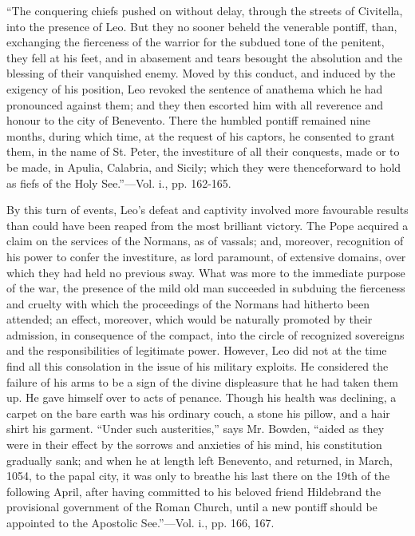 ``The
conquering chiefs pushed on without delay, through the streets of
Civitella, into the presence of Leo. But they no sooner beheld the
venerable pontiff, than, exchanging the fierceness of the warrior for
the subdued tone of the penitent, they fell at his feet, and in
abasement and tears besought the absolution and the blessing of their
vanquished enemy. Moved by this conduct, and induced by the exigency
of his position, Leo revoked the sentence of anathema which he had
pronounced against them; and they then escorted him with all reverence
and honour to the city of Benevento. There the humbled pontiff
remained nine months, during which time, at the request of his
captors, he consented to grant them, in the name of St. Peter, the
investiture of all their conquests, made or to be made, in Apulia,
Calabria, and Sicily; which they were thenceforward to hold as fiefs
of the Holy See.''—Vol. i., pp. 162-165.

By this turn of events, Leo's defeat and
captivity involved more favourable results than could have been reaped
from the most brilliant victory. The Pope acquired a claim on the
services of the Normans, as of vassals; and, moreover, recognition of
his power to confer the investiture, as lord paramount, of extensive
domains, over which they had held no previous sway. What was more to
the immediate purpose of the war, the presence of the mild old man
succeeded in subduing the fierceness and cruelty with which the
proceedings of the Normans had hitherto been attended; an effect, moreover, which would be naturally promoted by their
admission, in consequence of the compact, into the circle of
recognized sovereigns and the responsibilities of legitimate power.
However, Leo did not at the time find all this consolation in the
issue of his military exploits. He considered the failure of his arms
to be a sign of the divine displeasure that he had taken them up. He
gave himself over to acts of penance. Though his health was declining,
a carpet on the bare earth was his ordinary couch, a stone his pillow,
and a hair shirt his garment. ``Under such austerities,'' says Mr.
Bowden, ``aided as they were in their effect by the sorrows and
anxieties of his mind, his constitution gradually sank; and when he at
length left Benevento, and returned, in March, 1054, to the papal
city, it was only to breathe his last there on the 19th of the
following April, after having committed to his beloved friend
Hildebrand the provisional government of the Roman Church, until a new
pontiff should be appointed to the Apostolic See.''—Vol. i., pp. 166,
167.

